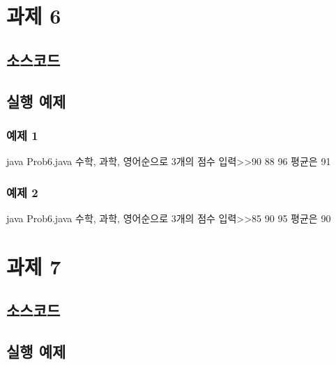 \documentclass{article}
\theoremstyle{nonumberplain}
\begin{document}
\section{과제 6}
\subsection{소스코드}
\subsection{실행 예제}
\subsubsection{예제 1}
\begin{console}
java Prob6.java
수학, 과학, 영어순으로 3개의 점수 입력>>90 88 96
평균은 91
\end{console}
\subsubsection{예제 2}
\begin{console}
java Prob6.java
수학, 과학, 영어순으로 3개의 점수 입력>>85 90 95
평균은 90
\end{console}



\section{과제 7}
\subsection{소스코드}
\subsection{실행 예제}
\end{document}
